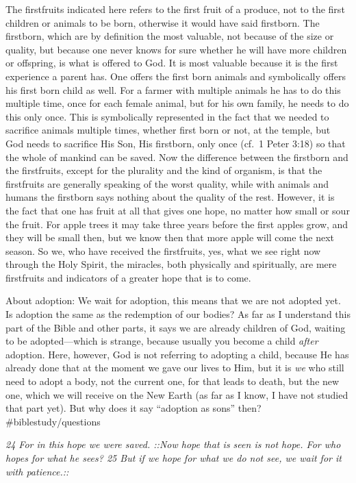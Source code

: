 The firstfruits indicated here refers to the first fruit of a produce,
not to the first children or animals to be born, otherwise it would have
said firstborn. The firstborn, which are by definition the most
valuable, not because of the size or quality, but because one never
knows for sure whether he will have more children or offspring, is what
is offered to God. It is most valuable because it is the first
experience a parent has. One offers the first born animals and
symbolically offers his first born child as well. For a farmer with
multiple animals he has to do this multiple time, once for each female
animal, but for his own family, he needs to do this only once. This is
symbolically represented in the fact that we needed to sacrifice animals
multiple times, whether first born or not, at the temple, but God needs
to sacrifice His Son, His firstborn, only once (cf.~1 Peter 3:18) so
that the whole of mankind can be saved. Now the difference between the
firstborn and the firstfruits, except for the plurality and the kind of
organism, is that the firstfruits are generally speaking of the worst
quality, while with animals and humans the firstborn says nothing about
the quality of the rest. However, it is the fact that one has fruit at
all that gives one hope, no matter how small or sour the fruit. For
apple trees it may take three years before the first apples grow, and
they will be small then, but we know then that more apple will come the
next season. So we, who have received the firstfruits, yes, what we see
right now through the Holy Spirit, the miracles, both physically and
spiritually, are mere firstfruits and indicators of a greater hope that
is to come.

About adoption: We wait for adoption, this means that we are not adopted
yet. Is adoption the same as the redemption of our bodies? As far as I
understand this part of the Bible and other parts, it says we are
already children of God, waiting to be adopted---which is strange,
because usually you become a child \emph{after} adoption. Here, however,
God is not referring to adopting a child, because He has already done
that at the moment we gave our lives to Him, but it is \emph{we} who
still need to adopt a body, not the current one, for that leads to
death, but the new one, which we will receive on the New Earth (as far
as I know, I have not studied that part yet). But why does it say
``adoption as sons'' then? \#biblestudy/questions

\emph{24 For in this hope we were saved. ::Now hope that is seen is not
hope. For who hopes for what he sees? 25 But if we hope for what we do
not see, we wait for it with patience.::}

